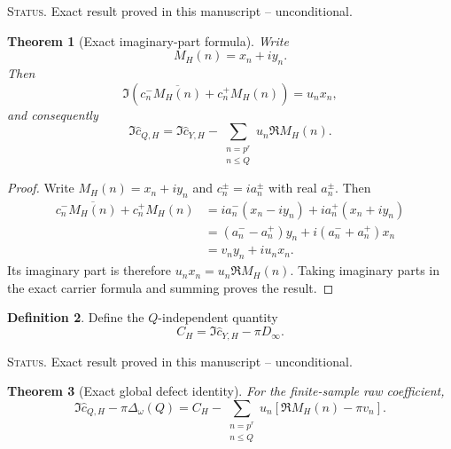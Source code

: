 \documentclass[11pt]{amsart}
\numberwithin{equation}{section}
\theoremstyle{plain}
\newtheorem{theorem}{Theorem}[section]
\theoremstyle{definition}
\newtheorem{definition}[theorem]{Definition}
\theoremstyle{remark}
\newcommand{\1}{\mathbf{1}}
\newcommand{\statusnote}[1]{%
  \par\smallskip\noindent
  \begingroup\footnotesize\textsc{Status.} #1\endgroup
  \par\smallskip}
\begin{document}
\statusnote{Exact result proved in this manuscript -- unconditional.}
\begin{theorem}[Exact imaginary-part formula]
\label{thm:imaginary_part_identity}
Write
\begin{equation}
M_H(n)=x_n+iy_n.
\label{eq:abstract_MH_xy}
\end{equation}
Then
\begin{equation}
\Im\left(c_n^-\overline{M_H(n)}+c_n^+M_H(n)\right)
=u_nx_n,
\label{eq:abstract_mode_imaginary_projection}
\end{equation}
and consequently
\begin{equation}
\boxed{
\Im\widehat c_{Q,H}
=
\Im\widehat c_{Y,H}
-
\sum_{\substack{n=p^r\\n\leq Q}}
u_n\Re M_H(n).
}
\label{eq:abstract_imaginary_part_identity}
\end{equation}
\end{theorem}

\begin{proof}
Write \(M_H(n)=x_n+iy_n\) and \(c_n^\pm=ia_n^\pm\) with real
\(a_n^\pm\).  Then
\begin{align}
c_n^-\overline{M_H(n)}+c_n^+M_H(n)
&=
ia_n^-(x_n-iy_n)+ia_n^+(x_n+iy_n)
\label{eq:imaginary_identity_expand_one}
\\
&=
(a_n^--a_n^+)y_n
+i(a_n^-+a_n^+)x_n
\label{eq:imaginary_identity_expand_two}
\\
&=
v_ny_n+iu_nx_n.
\label{eq:imaginary_identity_expand_three}
\end{align}
Its imaginary part is therefore \(u_nx_n=u_n\Re M_H(n)\).  Taking
imaginary parts in the exact carrier formula and summing proves the result.
\end{proof}

\begin{definition}
\label{def:CH}
Define the \(Q\)-independent quantity
\begin{equation}
C_H
=
\Im\widehat c_{Y,H}-\pi D_\infty.
\label{eq:CH_definition}
\end{equation}
\end{definition}

\statusnote{Exact result proved in this manuscript -- unconditional.}
\begin{theorem}[Exact global defect identity]
\label{thm:global_defect_identity}
For the finite-sample raw coefficient,
\begin{equation}
\boxed{
\Im\widehat c_{Q,H}-\pi\Delta_\omega(Q)
=
C_H
-
\sum_{\substack{n=p^r\\n\leq Q}}
u_n\left[
\Re M_H(n)-\pi v_n
\right].
}
\label{eq:global_defect_identity}
\end{equation}
\end{theorem}
\end{document}
